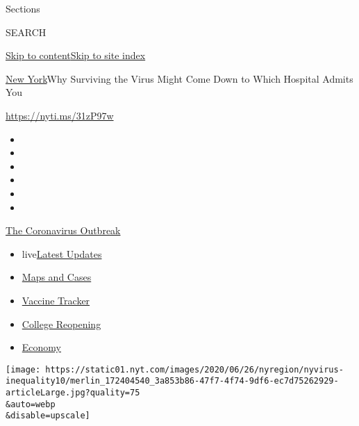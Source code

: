 Sections

SEARCH

\protect\hyperlink{site-content}{Skip to
content}\protect\hyperlink{site-index}{Skip to site index}

\href{/section/nyregion}{New York}\textbar{}Why Surviving the Virus
Might Come Down to Which Hospital Admits You

\url{https://nyti.ms/31zP97w}

\begin{itemize}
\item
\item
\item
\item
\item
\item
\end{itemize}

\href{https://www.nytimes.com/news-event/coronavirus?action=click\&pgtype=Article\&state=default\&region=TOP_BANNER\&context=storylines_menu}{The
Coronavirus Outbreak}

\begin{itemize}
\tightlist
\item
  live\href{https://www.nytimes.com/2020/08/04/world/coronavirus-covid-19.html?action=click\&pgtype=Article\&state=default\&region=TOP_BANNER\&context=storylines_menu}{Latest
  Updates}
\item
  \href{https://www.nytimes.com/interactive/2020/us/coronavirus-us-cases.html?action=click\&pgtype=Article\&state=default\&region=TOP_BANNER\&context=storylines_menu}{Maps
  and Cases}
\item
  \href{https://www.nytimes.com/interactive/2020/science/coronavirus-vaccine-tracker.html?action=click\&pgtype=Article\&state=default\&region=TOP_BANNER\&context=storylines_menu}{Vaccine
  Tracker}
\item
  \href{https://www.nytimes.com/2020/08/02/us/covid-college-reopening.html?action=click\&pgtype=Article\&state=default\&region=TOP_BANNER\&context=storylines_menu}{College
  Reopening}
\item
  \href{https://www.nytimes.com/live/2020/08/03/business/stock-market-today-coronavirus?action=click\&pgtype=Article\&state=default\&region=TOP_BANNER\&context=storylines_menu}{Economy}
\end{itemize}

\texttt{[image: https://static01.nyt.com/images/2020/06/26/nyregion/nyvirus-inequality10/merlin\_172404540\_3a853b86-47f7-4f74-9df6-ec7d75262929-articleLarge.jpg?quality=75\\\&auto=webp\\\&disable=upscale]}

